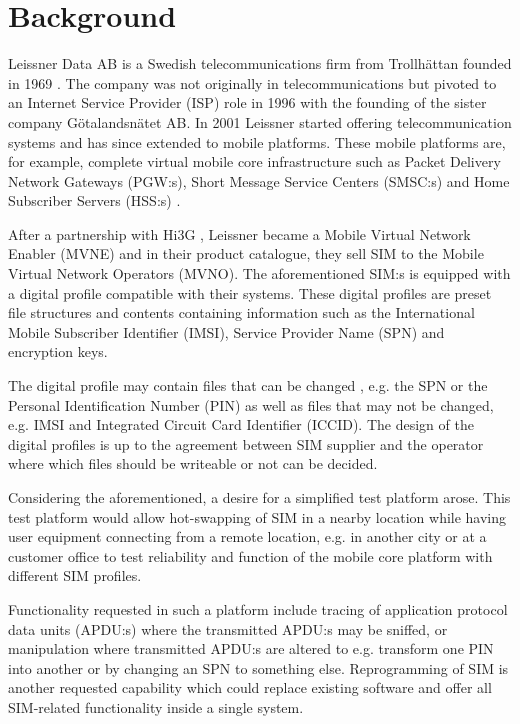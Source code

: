 \section{Background}

Leissner Data AB is a Swedish telecommunications firm from
Trollhättan founded in 1969 \cite{leissner-about}. The company
was not originally in telecommunications but pivoted to an 
Internet Service Provider (ISP) role in 1996 with the founding of
the sister company Götalandsnätet AB. In 2001 Leissner started
offering telecommunication systems and has since extended to mobile
platforms. These mobile platforms are, for example, complete
virtual mobile core infrastructure such as Packet Delivery Network
Gateways (PGW:s), Short Message Service Centers (SMSC:s) and Home
Subscriber Servers (HSS:s) \cite{leissner-mobile-core}.

After a partnership with Hi3G \cite{leissner-about}, Leissner
became a Mobile Virtual Network Enabler (MVNE) and in their
product catalogue, they sell SIM to the Mobile Virtual Network
Operators (MVNO). The aforementioned SIM:s is equipped with a
digital profile compatible with their systems. These digital
profiles are preset file structures and contents containing
information such as the International Mobile Subscriber Identifier
(IMSI), Service Provider Name (SPN) and encryption keys.

The digital profile may contain files that can be changed \cite{what-is-a-smart-card-profile}, e.g.
the SPN or the Personal Identification Number (PIN) as well as
files that may not be changed, e.g. IMSI and Integrated Circuit
Card Identifier (ICCID). The design of the digital profiles is up
to the agreement between SIM supplier and the operator where which
files should be writeable or not can be decided.

Considering the aforementioned, a desire for a simplified test
platform arose. This test platform would allow hot-swapping of
SIM in a nearby location while having user equipment connecting
from a remote location, e.g. in another city or at a customer
office to test reliability and function of the mobile core
platform with different SIM profiles.

Functionality requested in such a platform include tracing of
application protocol data units (APDU:s) where the transmitted
APDU:s may be sniffed, or manipulation where transmitted APDU:s
are altered to e.g. transform one PIN into another or by changing
an SPN to something else. Reprogramming of SIM is another
requested capability which could replace existing software and
offer all SIM-related functionality inside a single system.

